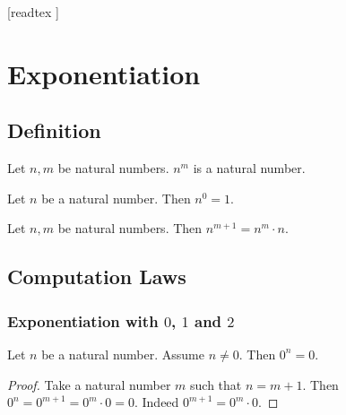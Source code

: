 \documentclass[10pt]{article}
\begin{document}
  \begin{imports}
    \begin{forthel}
      [readtex ]
    \end{forthel}
  \end{imports}


  \section*{Exponentiation}

  \subsection*{Definition}

  \begin{forthel}
    \begin{signature}[id=ARITHMETIC_09_3663815629602816,printid]
      Let $n, m$ be natural numbers.
      $n^{m}$ is a natural number.
    \end{signature}
  \end{forthel}

  \begin{forthel}
    \begin{axiom}[id=ARITHMETIC_09_5368818025103360,printid]
      Let $n$ be a natural number.
      Then $n^{0} = 1$.
    \end{axiom}
  \end{forthel}

  \begin{forthel}
    \begin{axiom}[id=ARITHMETIC_09_4140498660884480,printid]
      Let $n, m$ be natural numbers.
      Then $n^{m + 1} = n^{m} \cdot n$.
    \end{axiom}
  \end{forthel}


  \subsection*{Computation Laws}

  \subsubsection*{Exponentiation with $0$, $1$ and $2$}

  \begin{forthel}
    \begin{proposition}[id=ARITHMETIC_09_4673644676513792,printid]
      Let $n$ be a natural number.
      Assume $n \neq 0$.
      Then $0^{n} = 0$.
    \end{proposition}
    \begin{proof}
      Take a natural number $m$ such that $n = m + 1$.
      Then $0^{n}
        = 0^{m + 1}
        = 0^{m} \cdot 0
        = 0$.
      Indeed $0^{m + 1} = 0^{m} \cdot 0$.
    \end{proof}
  \end{forthel}
\end{document}
